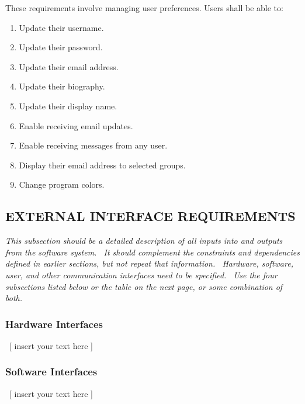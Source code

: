 \documentclass[twoside,letterpaper]{article}
\begin{document}
{These requirements involve managing user preferences. Users shall be able to:

\begin{enumerate}
	\item Update their username.
	\item Update their password.
	\item Update their email address.
	\item Update their biography.
	\item Update their display name.
	\item Enable receiving email updates.
	\item Enable receiving messages from any user.
	\item Display their email address to selected groups.
	\item Change program colors.
\end{enumerate}

}

\subsection[EXTERNAL INTERFACE REQUIREMENTS]{\rmfamily\bfseries\color{black} EXTERNAL INTERFACE
REQUIREMENTS}
\hypertarget{RefHeading20659017292}{}{\itshape\color{black}
This subsection should be a detailed description of all inputs into and outputs from the software system. \ It should
complement the constraints and dependencies defined in earlier sections, but not repeat that information. \ Hardware,
software, user, and other communication interfaces need to be specified. \ Use the four subsections listed below or the
table on the next page, or some combination of both.}

\subsubsection[Hardware Interfaces]{\rmfamily\bfseries\color{black} Hardware Interfaces}
\hypertarget{RefHeading20859017292}{}{\color{black}
\foreignlanguage{english}{\ [ insert your text here ]}}

\subsubsection[Software Interfaces]{\rmfamily\bfseries\color{black} Software Interfaces}
\hypertarget{RefHeading21059017292}{}{\color{black}
\foreignlanguage{english}{\ [ insert your text here ]}}
\end{document}
